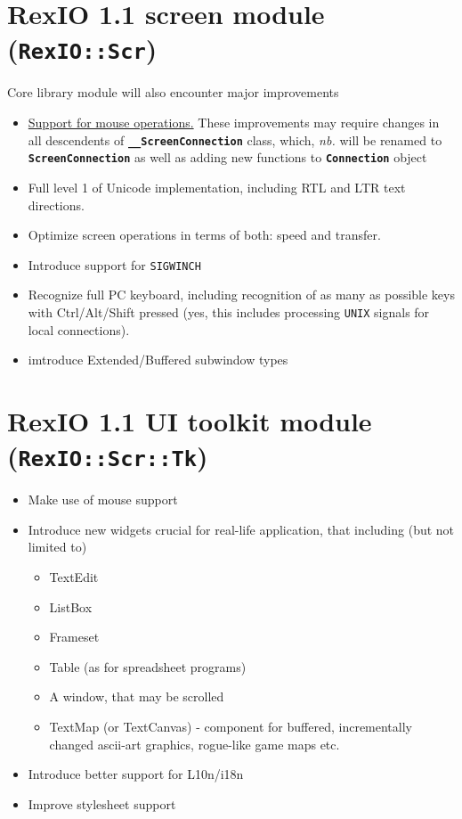 \documentclass[11pt,a4paper]{article}
\newcommand{\Class}[1]{\texttt{\textbf{#1}}}
\begin{document}
\section{RexIO 1.1 screen module (\texttt{RexIO::Scr})}

Core library module will also encounter major improvements

\begin{itemize}
\item \underline{Support for mouse operations.} These improvements may
  require changes in all descendents of \Class{\_\_ScreenConnection}
  class, which, \textit{nb.} will be renamed to
  \Class{ScreenConnection} as well as adding new functions to
  \Class{Connection} object
\item Full level 1 of Unicode implementation, including RTL and LTR
  text directions.
\item Optimize screen operations in terms of both: speed and transfer.
\item Introduce support for \texttt{SIGWINCH}
\item Recognize full PC keyboard, including recognition of as many as
  possible keys with Ctrl/Alt/Shift pressed (yes, this includes
  processing \texttt{UNIX} signals for local connections).
\item imtroduce Extended/Buffered subwindow types
\end{itemize}

\section{RexIO 1.1 UI toolkit module (\texttt{RexIO::Scr::Tk})}

\begin{itemize}
\item Make use of mouse support
\item Introduce new widgets crucial for real-life application, that
  including (but not limited to)
  \begin{itemize}
  \item TextEdit
  \item ListBox
  \item Frameset 
  \item Table (as for spreadsheet programs)
  \item A window, that may be scrolled
  \item TextMap (or TextCanvas) - component for buffered, incrementally 
	changed ascii-art graphics, rogue-like game maps etc.
  \end{itemize}
\item Introduce better support for L10n/i18n
\item Improve stylesheet support
\end{itemize}
\end{document}
